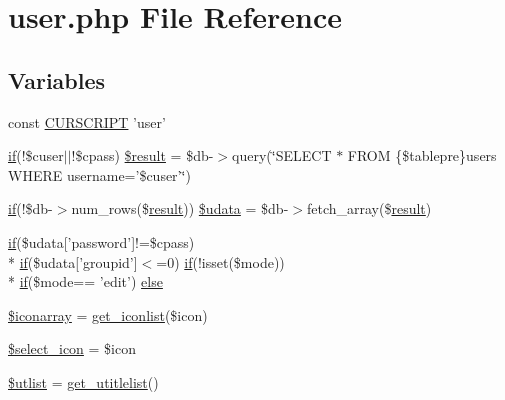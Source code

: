 \hypertarget{user_8php}{\section{user.\+php File Reference}
\label{user_8php}
}
\subsection*{Variables}
\begin{DoxyCompactItemize}
\item 
const \hyperlink{user_8php_a39c39f525eceb86cabc338804f230e80}{C\+U\+R\+S\+C\+R\+I\+P\+T} 'user'
\item 
\hyperlink{login__old_8php_a4ac1118c2e44c513a674bc1793ba6c90}{if}(!\$cuser$\vert$$\vert$!\$cpass) \hyperlink{user_8php_aa26a75c10464e039aa68f93507070136}{\$result} = \$db-\/$>$query(\char`\"{}S\+E\+L\+E\+C\+T $\ast$ F\+R\+O\+M \{\$tablepre\}users W\+H\+E\+R\+E username='\$cuser'\char`\"{})
\item 
\hyperlink{login__old_8php_a4ac1118c2e44c513a674bc1793ba6c90}{if}(!\$db-\/$>$num\+\_\+rows(\$\hyperlink{templates_2install_8php_abdecde238169a1e34f68354fc9968af0}{result})) \hyperlink{user_8php_aa64a6e7c321a5fc5c5089fc201f285cb}{\$udata} = \$db-\/$>$fetch\+\_\+array(\$\hyperlink{templates_2install_8php_abdecde238169a1e34f68354fc9968af0}{result})
\item 
\hyperlink{login__old_8php_a4ac1118c2e44c513a674bc1793ba6c90}{if}(\$udata\mbox{[}'password'\mbox{]}!=\$cpass) \\*
\hyperlink{login__old_8php_a4ac1118c2e44c513a674bc1793ba6c90}{if}(\$udata\mbox{[}'groupid'\mbox{]}$<$=0) \hyperlink{login__old_8php_a4ac1118c2e44c513a674bc1793ba6c90}{if}(!isset(\$mode)) \\*
\hyperlink{login__old_8php_a4ac1118c2e44c513a674bc1793ba6c90}{if}(\$mode== 'edit') \hyperlink{user_8php_a41373a6e07fe465a99fd5d108c71869c}{else}
\item 
\hyperlink{user_8php_ae8f70f9240aceaf398e05d6e00e7b8e5}{\$iconarray} = \hyperlink{user_8func_8php_a7a9045f8927edbb8c9fd22b5f9effd7c}{get\+\_\+iconlist}(\$icon)
\item 
\hyperlink{user_8php_a18d851a26297fb49eda4d94e0605ba05}{\$select\+\_\+icon} = \$icon
\item 
\hyperlink{user_8php_a1fdf35fc8874f8e416efbc37175a4a5b}{\$utlist} = \hyperlink{user_8func_8php_a71f806e36e9a39ec938f2fca83bafd49}{get\+\_\+utitlelist}()
\end{DoxyCompactItemize}


